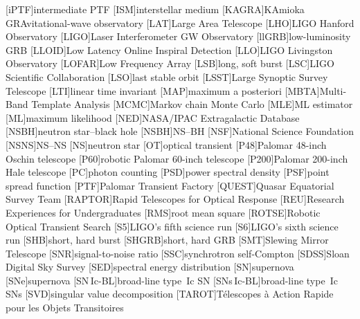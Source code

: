 \begin{acronym}
[\textup{i}PTF]{intermediate \acl{PTF}}
[ISM]{interstellar medium}
[KAGRA]{KAmioka GRAvitational\nobreakdashes-wave observatory}
[LAT]{Large Area Telescope}
[LHO]{\ac{LIGO} Hanford Observatory}
[LIGO]{Laser Interferometer \acs{GW} Observatory}
[\textup{ll}GRB]{low\nobreakdashes-luminosity \ac{GRB}}
[LLOID]{Low Latency Online Inspiral Detection}
[LLO]{\ac{LIGO} Livingston Observatory}
[LOFAR]{Low Frequency Array}
[LSB]{long, soft burst}
[LSC]{\acs{LIGO} Scientific Collaboration}
[LSO]{last stable orbit}
[LSST]{Large Synoptic Survey Telescope}
[LTI]{linear time invariant}
[MAP]{maximum a posteriori}
[MBTA]{Multi-Band Template Analysis}
[MCMC]{Markov chain Monte Carlo}
[MLE]{\ac{ML} estimator}
[ML]{maximum likelihood}
[NED]{NASA/IPAC Extragalactic Database}
[NSBH]{neutron star\nobreakdashes--black hole}
[NSBH]{\acl{NS}\nobreakdashes--\acl{BH}}
[NSF]{National Science Foundation}
[NSNS]{\acl{NS}\nobreakdashes--\acl{NS}}
[NS]{neutron star}
[OT]{optical transient}
[P48]{Palomar 48\nobreakdashes-inch Oschin telescope}
[P60]{robotic Palomar 60\nobreakdashes-inch telescope}
[P200]{Palomar 200\nobreakdashes-inch Hale telescope}
[PC]{photon counting}
[PSD]{power spectral density}
[PSF]{point spread function}
[PTF]{Palomar Transient Factory}
[QUEST]{Quasar Equatorial Survey Team}
[RAPTOR]{Rapid Telescopes for Optical Response}
[REU]{Research Experiences for Undergraduates}
[RMS]{root mean square}
[ROTSE]{Robotic Optical Transient Search}
[S5]{\ac{LIGO}'s fifth science run}
[S6]{\ac{LIGO}'s sixth science run}
[SHB]{short, hard burst}
[SHGRB]{short, hard \acl{GRB}}
[SMT]{Slewing Mirror Telescope}
[SNR]{signal\nobreakdashes-to\nobreakdashes-noise ratio}
[SSC]{synchrotron self\nobreakdashes-Compton}
[SDSS]{Sloan Digital Sky Survey}
[SED]{spectral energy distribution}
[SN]{supernova}
[SN\textup{e}]{supernova}
[\acs{SN}\,I\textup{c}\nobreakdashes-BL]{broad\nobreakdashes-line type~Ic \ac{SN}}
[\acsp{SN}\,I\textup{c}\nobreakdashes-BL]{broad\nobreakdashes-line type~Ic \acp{SN}}
[SVD]{singular value decomposition}
[TAROT]{T\'{e}lescopes \`{a} Action Rapide pour les Objets Transitoires}

\end{acronym}
